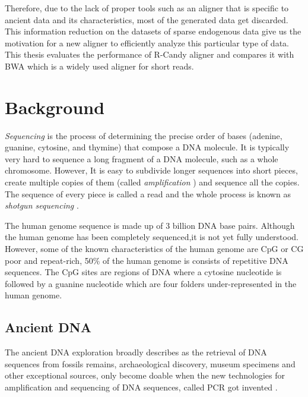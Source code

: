 \documentclass[11pt,a4paper]{report}
\begin{document}
Therefore, due to the lack of proper tools such as an aligner that is 
specific to ancient data and its characteristics, most of the generated 
data get discarded. 
This information reduction on the datasets of sparse endogenous data give 
us the motivation for a new aligner to efficiently analyze this particular
type of data.
\\
This thesis evaluates the performance of R-Candy aligner and compares it 
with BWA which is a widely used aligner for short reads.






\clearpage
\section{Background } \label{Background }


\emph{Sequencing} is the process of determining the precise order of bases 
(adenine, guanine, cytosine, and thymine) that compose a DNA molecule. 
It is typically very hard to sequence a long fragment of a DNA molecule, 
such as a whole chromosome. However, It is easy to subdivide longer sequences
into short pieces, create multiple copies of them (called \emph{amplification} ) 
and sequence all the copies. The sequence of every piece is called a read and 
the whole process is known as \emph{shotgun sequencing} \cite{algorithmDesign}.

The human genome sequence is made up of 3 billion DNA base pairs.
Although the human genome has been completely sequenced,it is not yet fully 
understood. However, some of the known characteristics of the human genome 
are CpG or CG poor and repeat-rich, 50\% of the human genome is consists 
of repetitive DNA sequences.
The CpG sites are regions of DNA where a cytosine nucleotide is followed by 
a guanine nucleotide which are four folders under-represented in the human genome. 



\subsection{Ancient DNA } \label{Ancient DNA }
The ancient DNA exploration broadly describes as the retrieval of DNA sequences 
from fossils remains, archaeological discovery, museum specimens and other 
exceptional sources, only become doable when the new technologies for amplification
and sequencing of DNA sequences, called PCR got invented \cite{paabo2004genetic}.
\end{document}
